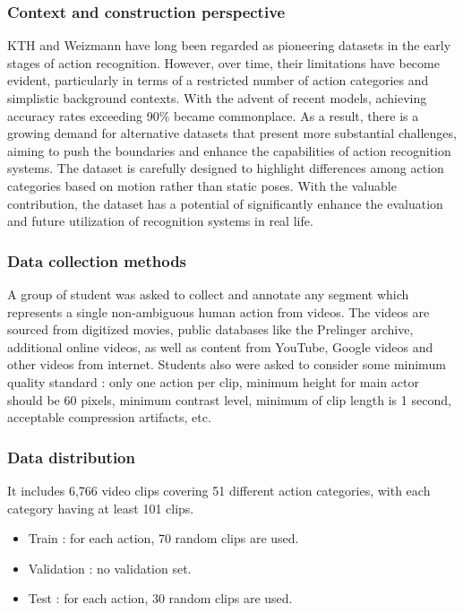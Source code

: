 \documentclass[10pt,onecolumn,letterpaper]{article}
\begin{document}
\subsubsection{\textbf{Context and construction perspective}}
KTH \cite{KTH} and Weizmann \cite{Weizmann} have long been regarded as
pioneering datasets in the early stages of action recognition. However, over
time, their limitations have become evident, particularly in terms of a
restricted number of action categories and simplistic background contexts. With
the advent of recent models, achieving accuracy rates exceeding 90\% became
commonplace. As a result, there is a growing demand for alternative datasets
that present more substantial challenges, aiming to push the boundaries and
enhance the capabilities of action recognition systems. The dataset is carefully
designed to highlight differences among action categories based on motion rather
than static poses. With the valuable contribution, the dataset has a potential
of significantly enhance the evaluation and future utilization of recognition
systems in real life. 

\subsubsection{\textbf{Data collection methods}}
A group of student was asked to collect and annotate any segment which represents
a single non-ambiguous human action from videos. The videos are sourced from
digitized movies, public databases like the Prelinger archive, additional online
videos, as well as content from YouTube, Google videos and other videos from
internet. Students also were asked to consider some minimum quality standard : 
only one action per clip, minimum height for main actor should be 60 pixels,
minimum contrast level, minimum of clip length is 1 second, acceptable
compression artifacts, etc. 

\subsubsection{\textbf{Data distribution}} 
It includes 6,766 video clips covering 51 different action categories, with each
category having at least 101 clips. 
\begin{itemize}
	\item Train : for each action, 70 random clips are used.
	\item Validation : no validation set.
	\item Test : for each action, 30 random clips are used. 
\end{itemize}
\end{document}

